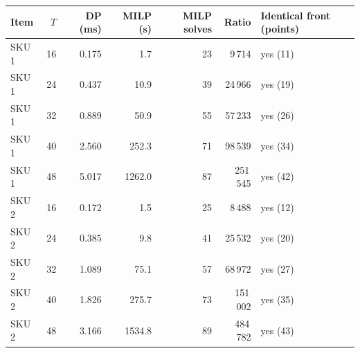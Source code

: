 \begin{tabular}{@{}lrrrrrl@{}}
\toprule
Item & $T$ & DP (ms) & MILP (s) & MILP solves & Ratio & Identical front (points) \\
\midrule
SKU 1 & 16 & 0.175 & 1.7 & 23 & 9\,714 & yes (11) \\
SKU 1 & 24 & 0.437 & 10.9 & 39 & 24\,966 & yes (19) \\
SKU 1 & 32 & 0.889 & 50.9 & 55 & 57\,233 & yes (26) \\
SKU 1 & 40 & 2.560 & 252.3 & 71 & 98\,539 & yes (34) \\
SKU 1 & 48 & 5.017 & 1262.0 & 87 & 251\,545 & yes (42) \\
SKU 2 & 16 & 0.172 & 1.5 & 25 & 8\,488 & yes (12) \\
SKU 2 & 24 & 0.385 & 9.8 & 41 & 25\,532 & yes (20) \\
SKU 2 & 32 & 1.089 & 75.1 & 57 & 68\,972 & yes (27) \\
SKU 2 & 40 & 1.826 & 275.7 & 73 & 151\,002 & yes (35) \\
SKU 2 & 48 & 3.166 & 1534.8 & 89 & 484\,782 & yes (43) \\
\bottomrule
\end{tabular}
